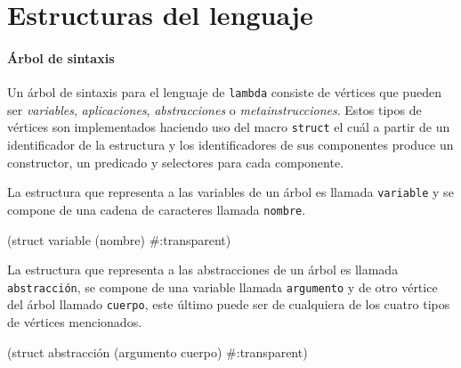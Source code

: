 \documentclass[letterpaper,twoside,openright,10pt]{book}
\begin{document}
\nwenddocs{}\section*{Estructuras del lenguaje}

\nwenddocs{}\paragraph{Árbol de sintaxis}

Un árbol de sintaxis para el lenguaje de {\tt{}lambda} consiste de vértices que pueden ser \emph{variables}, \emph{aplicaciones}, \emph{abstracciones} o \emph{metainstrucciones}. Estos tipos de vértices son implementados haciendo uso del macro {\tt{}struct} el cuál a partir de un identificador de la estructura y los identificadores de sus componentes produce un constructor, un predicado y selectores para cada componente.

La estructura que representa a las variables de un árbol es llamada {\tt{}\protect{}variable} y se compone de una cadena de caracteres llamada {\tt{}nombre}.

\nwenddocs{}\endmoddef
(struct variable (nombre) #:transparent)
\eatline
{}\nwendcode{}\nwdocspar

La estructura que representa a las abstracciones de un árbol es llamada {\tt{}\protect{}abstracción}, se compone de una variable llamada {\tt{}argumento} y de otro vértice del árbol llamado {\tt{}cuerpo}, este último puede ser de cualquiera de los cuatro tipos de vértices mencionados.


\nwenddocs{}\plusendmoddef
(struct abstracción (argumento cuerpo) #:transparent)
\eatline
{}\nwendcode{}\nwdocspar
\end{document}
